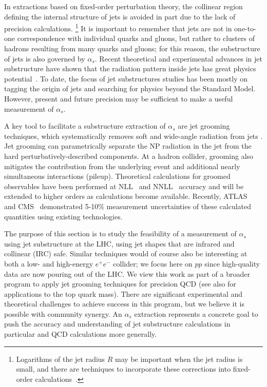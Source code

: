 \documentclass[11pt]{cernrep}
\begin{document}
In extractions based on fixed-order perturbation theory, the collinear region defining the internal
structure of jets is avoided in part due to the lack of precision calculations.%
\footnote{Logarithms of the jet radius $R$ may be important when the jet radius is small, and there are techniques to incorporate these corrections into fixed-order calculations~\cite{Dasgupta:2016bnd,Dasgupta:2014yra}.}
%
It is important to remember that jets are not in one-to-one correspondence with individual quarks and gluons, but rather to clusters of hadrons resulting from many quarks and gluons; for this reason, the substructure of jets is also governed by $\alpha_s$.
%
Recent theoretical and experimental advances in jet substructure have shown that the radiation pattern inside jets has great physics potential~\cite{Abdesselam:2010pt,Altheimer:2012mn,Altheimer:2013yza,Adams:2015hiv,Larkoski:2017jix}.
%
To date, the focus of jet substructures studies has been mostly on tagging the origin of jets and searching for physics beyond the Standard Model.
%
However, present and future precision may be sufficient to make a useful measurement of $\alpha_s$.

A key tool to facilitate a substructure extraction of $\alpha_s$ are jet grooming techniques, which systematically removes soft and wide-angle radiation from jets \cite{Butterworth:2008iy,Ellis:2009su,Ellis:2009me,Krohn:2009th,Dasgupta:2013ihk,Larkoski:2014wba}.
%
Jet grooming can parametrically separate the NP radiation in the jet from the hard perturbatively-described components.
%
At a hadron collider, grooming also mitigates the contribution from the underlying event and additional nearly simultaneous interactions (pileup).
%
Theoretical calculations for groomed observables have been performed at NLL~\cite{Marzani:2017kqd,Marzani:2017mva} and NNLL~\cite{Frye:2016aiz,Frye:2016okc} accuracy and will be extended to higher orders as calculations become available.
%
Recently, ATLAS~\cite{Aaboud:2017qwh} and CMS~\cite{CMS-PAS-SMP-16-010} demonstrated 5-10\% measurement uncertainties of these calculated quantities using existing technologies.

The purpose of this section is to study the feasibility of a measurement of $\alpha_s$ using jet substructure at the LHC, using jet shapes that are infrared and collinear (IRC) safe.
%
Similar techniques would of course also be interesting at both a low- and high-energy $e^+e^-$ collider; we focus here on $pp$ since high-quality data are now pouring out of the LHC.
%
We view this work as part of a broader program to apply jet grooming techniques for precision QCD (see also \cite{Hoang:2017kmk} for applications to the top quark mass).
%
There are significant experimental and theoretical challenges to achieve success in this program, but we believe it is possible with community synergy.
%
An $\alpha_s$ extraction represents a concrete goal to push the accuracy and understanding of jet substructure calculations in particular and QCD calculations more generally.
\end{document}
